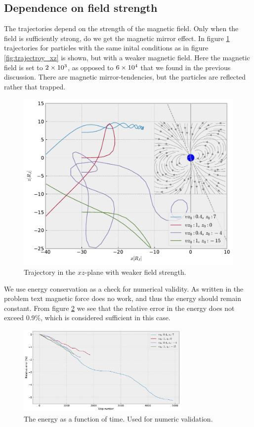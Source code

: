 \documentclass[a4paper, 12pt]{article}
\begin{document}
\subsection{Dependence on field strength}
The trajectories depend on the strength of the magnetic field.
Only when the field is sufficiently strong, do we get the magnetic mirror effect.
In figure \ref{fig:trajectory_xz_weak} trajectories for particles with the same inital conditions as in figure \ref{fig:trajectroy_xz} is shown, but with a weaker magnetic field.
Here the magnetic field is set to $\num{2E3}$, as opposed to $\num{6E4}$ that we found in the previous discussion.
There are magnetic mirror-tendencies, but the particles are reflected rather that trapped.\\

\begin{figure}[h]
  \centering
  \includegraphics[width=\textwidth]{media/trajectory_xz_plane_weak}
  \caption{Trajectory in the $xz$-plane with weaker field strength.\label{fig:trajectory_xz_weak}}
\end{figure}

We use energy conservation as a check for numerical validity.
As written in the problem text magnetic force does no work, and thus the energy should remain constant.
From figure \ref{fig:energy} we see that the relative error in the energy does not exceed 0.9\%, which is considered sufficient in this case.

\begin{figure}[h]
  \centering
  \includegraphics[width=0.75\textwidth]{media/energy}
  \caption{The energy as a function of time. Used for numeric validation.\label{fig:energy}}
\end{figure}
\end{document}
